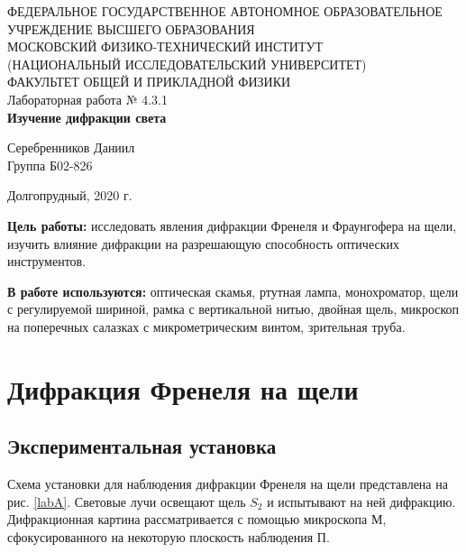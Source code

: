 \documentclass[a4paper,12pt]{article} %
\begin{document}
\begin{center}
	\footnotesize{ФЕДЕРАЛЬНОЕ ГОСУДАРСТВЕННОЕ АВТОНОМНОЕ ОБРАЗОВАТЕЛЬНОЕ 			УЧРЕЖДЕНИЕ ВЫСШЕГО ОБРАЗОВАНИЯ}\\
	\footnotesize{МОСКОВСКИЙ ФИЗИКО-ТЕХНИЧЕСКИЙ ИНСТИТУТ\\(НАЦИОНАЛЬНЫЙ 			ИССЛЕДОВАТЕЛЬСКИЙ УНИВЕРСИТЕТ)}\\
	\footnotesize{ФАКУЛЬТЕТ ОБЩЕЙ И ПРИКЛАДНОЙ ФИЗИКИ\\}
	\hfill \break
	\hfill\break
	\hfill\break
	\hfill \break
	\hfill \break
	\hfill \break
	\hfill \break
	\hfill \break
	\hfill \break
	\hfill \break
	\hfill \break
	\hfill \break
	\hfill \break
	\hfill \break
	\large{Лабораторная работа № 4.3.1 \\\textbf{Изучение дифракции света}}\\
	\hfill \break
	\hfill \break
	\hfill \break
	\begin{flushright}
		Серебренников Даниил\\
		Группа Б02-826
	\end{flushright}
	\hfill \break
	\hfill \break
	\hfill \break
	\hfill \break
	\hfill \break
	\hfill \break
	\hfill \break
	\hfill \break
	\hfill \break
	\hfill \break
	\hfill \break
\end{center}
\begin{center}
	Долгопрудный, 2020 г.
\end{center}
\thispagestyle{empty}
\newpage
	\textbf{Цель работы:} исследовать явления дифракции Френеля и Фраунгофера на щели, изучить влияние дифракции на разрешающую способность оптических инструментов.

	\textbf{В работе используются:} оптическая скамья, ртутная лампа, монохроматор, щели с регулируемой шириной, рамка с вертикальной нитью, двойная щель, микроскоп на поперечных салазках с микрометрическим винтом, зрительная труба.
\section{Дифракция Френеля на щели}

\subsection{Экспериментальная установка}

Схема установки для наблюдения дифракции Френеля на щели представлена на рис. \ref{labA}. Световые лучи освещают щель $ S_2 $ и испытывают на ней дифракцию. Дифракционная картина рассматривается с помощью микроскопа М, сфокусированного на некоторую плоскость наблюдения П.
\end{document}
